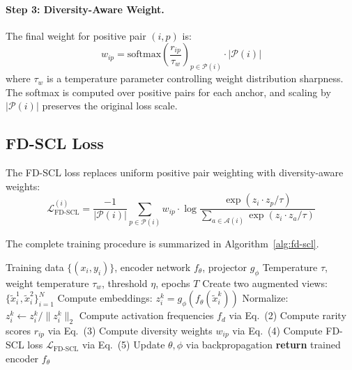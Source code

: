 \documentclass[11pt,a4paper]{article}
\newcommand{\cL}{\mathcal{L}}
\newcommand{\cA}{\mathcal{A}}
\newcommand{\cP}{\mathcal{P}}
\begin{document}
\paragraph{Step 3: Diversity-Aware Weight.}
The final weight for positive pair $(i, p)$ is:
\begin{equation}
w_{ip} = \text{softmax}\left(\frac{r_{ip}}{\tau_w}\right)_{p \in \cP(i)} \cdot |\cP(i)|
\end{equation}
where $\tau_w$ is a temperature parameter controlling weight distribution sharpness. The softmax is computed over positive pairs for each anchor, and scaling by $|\cP(i)|$ preserves the original loss scale.

\subsection{FD-SCL Loss}

The FD-SCL loss replaces uniform positive pair weighting with diversity-aware weights:
\begin{equation}
\cL_{\text{FD-SCL}}^{(i)} = \frac{-1}{|\cP(i)|} \sum_{p \in \cP(i)} w_{ip} \cdot \log \frac{\exp(z_i \cdot z_p / \tau)}{\sum_{a \in \cA(i)} \exp(z_i \cdot z_a / \tau)}
\end{equation}

The complete training procedure is summarized in Algorithm~\ref{alg:fd-scl}.

\begin{algorithm}[t]
\caption{FD-SCL Training Procedure}
\label{alg:fd-scl}
\begin{algorithmic}[1]
\REQUIRE Training data $\{(x_i, y_i)\}$, encoder network $f_\theta$, projector $g_\phi$
\REQUIRE Temperature $\tau$, weight temperature $\tau_w$, threshold $\eta$, epochs $T$
        \STATE Create two augmented views: $\{\tilde{x}_i^1, \tilde{x}_i^2\}_{i=1}^N$
        \STATE Compute embeddings: $z_i^k = g_\phi(f_\theta(\tilde{x}_i^k))$
        \STATE Normalize: $z_i^k \leftarrow z_i^k / \|z_i^k\|_2$
        \STATE Compute activation frequencies $f_d$ via Eq.~(2)
        \STATE Compute rarity scores $r_{ip}$ via Eq.~(3)
        \STATE Compute diversity weights $w_{ip}$ via Eq.~(4)
        \STATE Compute FD-SCL loss $\cL_{\text{FD-SCL}}$ via Eq.~(5)
        \STATE Update $\theta, \phi$ via backpropagation
    \ENDFOR
\ENDFOR
\STATE \textbf{return} trained encoder $f_\theta$
\end{algorithmic}
\end{algorithm}
\end{document}
